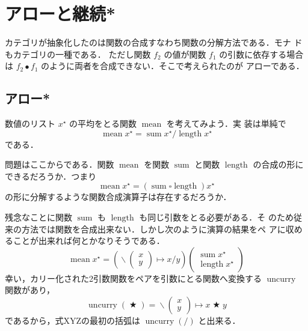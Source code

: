 \documentclass[a5paper,twoside,fleqn,draft]{jsbook}
\newenvironment{leader}{\begingroup\gt}{\endgroup}
\newcommand{\mAnonParam}{\diamond}
\newcommand{\mSpecialFunc}[1]{#1}
\DeclareMathOperator{\mLength}{\mSpecialFunc{length}}
\DeclareMathOperator{\mMean}{\mSpecialFunc{mean}}
\DeclareMathOperator{\mSum}{\mSpecialFunc{sum}}
\DeclareMathOperator{\mUncurry}{\mSpecialFunc{uncurry}}
\DeclareMathOperator{\mBinOp}{\bigstar}
\DeclareMathOperator{\mCompCat}{\bullet}
\DeclareMathOperator{\mLambda}{\backslash}
\DeclareMathOperator{\mLambdaArrow}{\mapsto}
\newcommand{\mPairWith}[2]{\begin{pmatrix}#1\\#2\end{pmatrix}}
\newcommand{\mList}[1]{{#1}^\mathrm{\star}}
\begin{document}
\chapter{アローと継続*}

\begin{leader}
  カテゴリが抽象化したのは関数の合成すなわち関数の分解方法である．モナ
  ドもカテゴリの一種である．%
  ただし関数 $f_2$ の値が関数 $f_1$ の引数に依存する場合は
  $f_2\mCompCat f_1$ のように両者を合成できない．そこで考えられたのが
  アローである．
\end{leader}

\section{アロー*}

数値のリスト $\mList{x}$ の平均をとる関数 $\mMean$ を考えてみよう．実
装は単純で
\begin{equation}
  \mMean\mList{x}
  =\mSum\mList{x}/\mLength\mList{x}
\end{equation}
である．

問題はここからである．関数 $\mMean$ を関数 $\mSum$ と関数 $\mLength$
の合成の形にできるだろうか．つまり
\begin{equation}
  \mMean\mList{x}=(\mSum\square\mLength)\mList{x}
\end{equation}
の形に分解するような関数合成演算子は存在するだろうか．

残念なことに関数 $\mSum$ も $\mLength$ も同じ引数をとる必要がある．そ
のため従来の方法では関数を合成出来ない．しかし次のように演算の結果をペ
アに収めることが出来れば何とかなりそうである．
\begin{equation}
  \mMean\mList{x}
  =%
  \left(\mLambda\mPairWith{x}{y}\mLambdaArrow x/y\right)
  \begin{pmatrix}
    \mSum\mList{x}\\
    \mLength\mList{x}
  \end{pmatrix}
\end{equation}
幸い，カリー化された2引数関数をペアを引数にとる関数へ変換する
$\mUncurry$ 関数があり，
\begin{equation}
  \mUncurry(\mBinOp)=\mLambda\mPairWith{x}{y}\mLambdaArrow x\mBinOp y
\end{equation}
であるから，式XYZの最初の括弧は $\mUncurry(/)$ と出来る．
\end{document}
